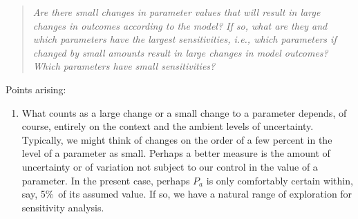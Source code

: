 \begin{quote}
{\it Are there small changes in parameter values that will result in large changes in outcomes according to the model?  If so, what are they and which parameters have the largest sensitivities, i.e., which parameters if changed by small amounts result in large changes in model outcomes? Which parameters have small sensitivities?}
\end{quote}
Points arising:
\begin{enumerate}
\item What counts as a large change or a small change to a parameter depends, of course, entirely on the context and the ambient levels of uncertainty.  Typically, we might think of changes on the order of a few percent in the level of a parameter as small. Perhaps a better measure is the amount of uncertainty or of variation not subject to our control in the value of a parameter. In the present case, perhaps $P_a$ is only comfortably certain within, say, 5\%\ of its assumed value. If so, we have a natural range of exploration for sensitivity analysis.


\end{enumerate}
